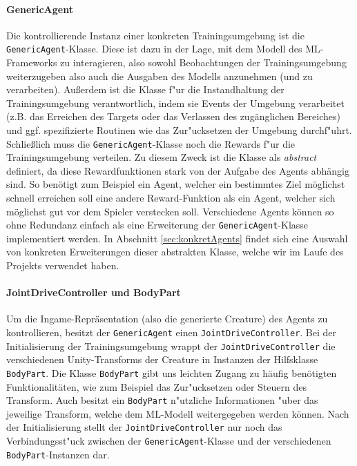 \paragraph{GenericAgent}

Die kontrollierende Instanz einer konkreten Trainingsumgebung ist die \texttt{GenericAgent}-Klasse. Diese ist dazu in der Lage, mit dem Modell des ML-Frameworks zu interagieren, also sowohl Beobachtungen der Trainingsumgebung weiterzugeben also auch die Ausgaben des Modells anzunehmen (und zu verarbeiten). Außerdem ist die Klasse f"ur die Instandhaltung der Trainingsumgebung verantwortlich, indem sie Events der Umgebung verarbeitet (z.B. das Erreichen des Targets oder das Verlassen des zugänglichen Bereiches) und ggf. spezifizierte Routinen wie das Zur"ucksetzen der Umgebung durchf"uhrt.
Schließlich muss die \texttt{GenericAgent}-Klasse noch die Rewards f"ur die Trainingsumgebung verteilen. Zu diesem Zweck ist die Klasse als \textit{abstract} definiert, da diese Rewardfunktionen stark von der Aufgabe des Agents abhängig sind. So benötigt zum Beispiel ein Agent, welcher ein bestimmtes Ziel möglichst schnell erreichen soll eine andere Reward-Funktion als ein Agent, welcher sich möglichst gut vor dem Spieler verstecken soll. Verschiedene Agents können so ohne Redundanz einfach als eine Erweiterung der \texttt{GenericAgent}-Klasse implementiert werden. In Abschnitt \ref{sec:konkretAgents} findet sich eine Auswahl von konkreten Erweiterungen dieser abstrakten Klasse, welche wir im Laufe des Projekts verwendet haben.

\paragraph{JointDriveController und BodyPart}

Um die Ingame-Repräsentation (also die generierte Creature) des Agents zu kontrollieren, besitzt der \texttt{GenericAgent} einen \texttt{JointDriveController}. Bei der Initialisierung der Trainingsumgebung wrappt der \texttt{JointDrive\-Controller} die verschiedenen Unity-Transforms der Creature in Instanzen der Hilfsklasse \texttt{BodyPart}. Die Klasse \texttt{BodyPart} gibt uns leichten Zugang zu häufig benötigten Funktionalitäten, wie zum Beispiel das Zur"ucksetzen oder Steuern des Transform. Auch besitzt ein \texttt{BodyPart} n"utzliche Informationen "uber das jeweilige Transform, welche dem ML-Modell weitergegeben werden können. Nach der Initialisierung stellt der \texttt{JointDriveController} nur noch das Verbindungsst"uck zwischen der \texttt{GenericAgent}-Klasse und der verschiedenen \texttt{BodyPart}-Instanzen dar. 


